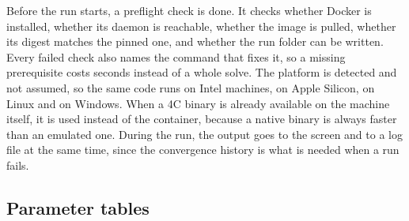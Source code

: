 Before the run starts, a preflight check is done. It checks whether Docker is installed, whether its daemon is reachable, whether the image is pulled, whether its digest matches the pinned one, and whether the run folder can be written. Every failed check also names the command that fixes it, so a missing prerequisite costs seconds instead of a whole solve. The platform is detected and not assumed, so the same code runs on Intel machines, on Apple Silicon, on Linux and on Windows. When a 4C binary is already available on the machine itself, it is used instead of the container, because a native binary is always faster than an emulated one. During the run, the output goes to the screen and to a log file at the same time, since the convergence history is what is needed when a run fails.

\FloatBarrier
\subsection{Parameter tables}
\label{app:parameters}

